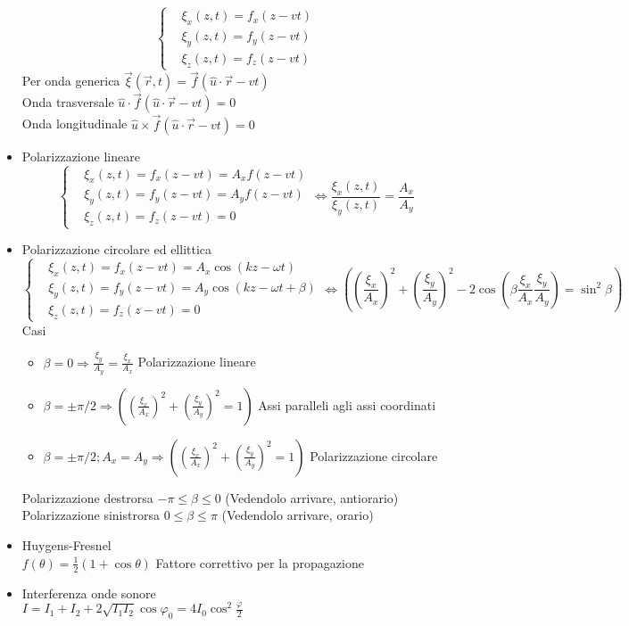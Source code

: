 \documentclass[a4paper]{article}
\begin{document}
\begin{itemize}
\begin{equation*}
 		\begin{cases}
 			 & \text{$\xi_x(z,t)=f_x(z-vt)$}\\
 			 & \text{$\xi_y(z,t)=f_y(z-vt)$}\\
 			 & \text{$\xi_z(z,t)=f_z(z-vt)$}
 		\end{cases}
 	\end{equation*}
 	Per onda generica $\overrightarrow{\xi}(\overrightarrow{r},t)=\overrightarrow{f}(\hat{u}\cdot \overrightarrow{r} - vt)$\\
 	Onda trasversale $\hat{u} \cdot \overrightarrow{f}(\hat{u}\cdot \overrightarrow{r} - vt) = 0$\\
 	Onda longitudinale $\hat{u} \times \overrightarrow{f}(\hat{u}\cdot \overrightarrow{r} - vt) = 0$\\
 	\item Polarizzazione lineare
 	\begin{equation*}
 		\begin{cases}
 			& \text{$\xi_x(z,t)=f_x(z-vt)=A_x f(z-vt)$}\\
 			& \text{$\xi_y(z,t)=f_y(z-vt)=A_y f(z-vt)$}\\
 			& \text{$\xi_z(z,t)=f_z(z-vt)=0$}
 		\end{cases} \iff \frac{\xi_x(z,t)}{\xi_y(z,t)}=\frac{A_x}{A_y}
 	\end{equation*} 
 	\item Polarizzazione circolare ed ellittica
 	\begin{equation*}
 		\begin{cases}
 			& \text{$\xi_x(z,t)=f_x(z-vt)=A_x \cos(kz-\omega t)$}\\
 			& \text{$\xi_y(z,t)=f_y(z-vt)=A_y \cos(kz-\omega t +\beta)$}\\
 			& \text{$\xi_z(z,t)=f_z(z-vt)=0$}
 		\end{cases} \iff ((\frac{\xi_x}{A_x})^2+(\frac{\xi_y}{A_y})^2-2\cos(\beta \frac{\xi_x}{A_x} \frac{\xi_y}{A_y}) = \sin^2{\beta})
 	\end{equation*} 
 Casi \begin{itemize}
 	\item $\beta = 0 \Rightarrow \frac{\xi_y}{A_y}=\frac{\xi_x}{A_x}$ Polarizzazione lineare
 	\item $\beta=\pm \pi/2 \Rightarrow ((\frac{\xi_x}{A_x})^2+(\frac{\xi_y}{A_y})^2=1)$ Assi paralleli agli assi coordinati
 	\item $\beta=\pm \pi/2; A_x =A_y \Rightarrow ((\frac{\xi_x}{A_x})^2+(\frac{\xi_y}{A_y})^2=1)$ Polarizzazione circolare
 \end{itemize}
Polarizzazione destrorsa $-\pi \leq \beta \leq 0$ (Vedendolo arrivare, antiorario)\\
Polarizzazione sinistrorsa $0 \leq \beta \leq \pi$ (Vedendolo arrivare, orario)
\item Huygens-Fresnel\\
$f(\theta) =\frac{1}{2}(1+\cos\theta)$ Fattore correttivo per la propagazione
\item Interferenza onde sonore\\
$I=I_1+I_2+2\sqrt{I_1I_2}\cos \varphi_0=4 I_0 \cos^2 \frac{\varphi}{2}$
 		
 \end{itemize}	
\end{document}
